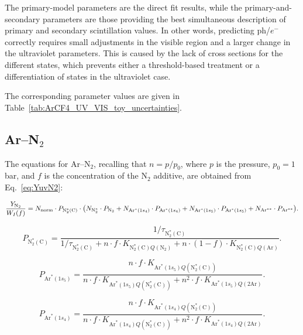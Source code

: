 \documentclass[12pt,a4paper]{article}
\newcommand{\N}{\mathrm{N}}
\newcommand{\Ar}{\mathrm{Ar}}
\newcommand{\NC}{\mathrm{N}_2^*(\mathrm{C})}
\newcommand{\norma}{\mathrm{norm}}
\DeclareRobustCommand{\ArOneSFour}{\ensuremath{\mathrm{Ar}^*(1s_4)}}
\DeclareRobustCommand{\ArOneSFive}{\ensuremath{\mathrm{Ar}^*(1s_5)}}
\begin{document}
The primary-model parameters are the direct fit results, while the primary-and-secondary parameters are those providing the best simultaneous description of primary and secondary scintillation values. In other words, predicting ph/$e^-$ correctly requires small adjustments in the visible region and a larger change in the ultraviolet parameters. This is caused by the lack of cross sections for the different states, which prevents either a threshold-based treatment or a differentiation of states in the ultraviolet case.

The corresponding parameter values are given in Table~\ref{tab:ArCF4_UV_VIS_toy_uncertainties}.




\subsection{Ar--N$_2$}

The equations for Ar--N$_2$, recalling that $n=p/p_0$, where $p$ is the pressure, $p_0=1$ bar, and $f$ is the concentration of the $\N_2$ additive, are obtained from Eq.~\ref{eq:YuvN2}:

\begin{equation*}
    \frac{Y_{\N_2}}{W_I(f)}
    =
    {N_{\norma}}
    \cdot
    P_{\NC}
    \cdot
    \pqty{
      N_{\N_2^*}\cdot P_{\N_2}
      +
      N_{\ArOneSFour}\cdot P_{\ArOneSFour}
      +
      N_{\ArOneSFive}\cdot P_{\ArOneSFive}
      + N_{\Ar^{**}} \cdot P_{\Ar^{**}}
    }.
\end{equation*}

\begin{equation}
    P_{\NC}
    =
    \frac{1/\tau_{\NC}}{
    1/\tau_{\NC}
    +
    n \cdot f \cdot K_{\NC Q(\N_2)}
    +
    n \cdot (1-f) \cdot K_{\NC Q(\Ar)}}.
\end{equation}

\begin{equation}
    P_{\ArOneSFive}
    =
    \frac{n \cdot f \cdot K_{\ArOneSFive Q(\NC)}}{
    n \cdot f \cdot K_{\ArOneSFive Q(\NC)}
    +
    n^2 \cdot f \cdot K_{\ArOneSFive Q(2\Ar)}}.
\end{equation}

\begin{equation}
    P_{\ArOneSFour}
    =
    \frac{n \cdot f \cdot K_{\ArOneSFour Q(\NC)}}{
    n \cdot f \cdot K_{\ArOneSFour Q(\NC)}
    +
    n^2 \cdot f \cdot K_{\ArOneSFour Q(2\Ar)}}.
\end{equation}
\end{document}
